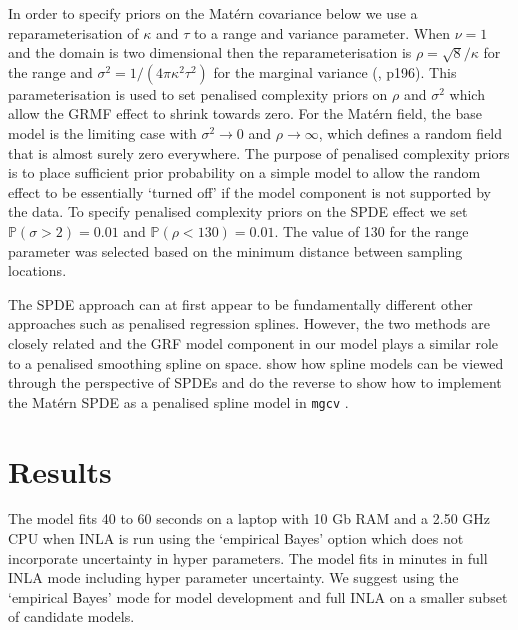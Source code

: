 \documentclass{stylefile16/statsoc}
\begin{document}
In order to specify priors on the Mat\'ern covariance below we use a reparameterisation of $\kappa$ and $\tau$ to a range and variance parameter.  When $\nu = 1$ and the domain is two dimensional then the reparameterisation is $\rho = \sqrt{8} / \kappa$ for the range and $\sigma^2 = 1 / (4\pi\kappa^2\tau^2)$ for the marginal variance (\cite{blangiardo_spatial_2013}, p196).  This parameterisation is used to set penalised complexity priors \citep{simpson_penalising_2017} on $\rho$ and $\sigma^2$ which allow the GRMF effect to shrink towards zero.  For the Mat\'ern field, the base model is the limiting case with $\sigma^2 \rightarrow 0$ and $\rho \rightarrow \infty$, which defines a random field that is almost surely zero everywhere.  The purpose of penalised complexity priors is to place sufficient prior probability on a simple model to allow the random effect to be essentially `turned off' if the model component is not supported by the data.  To specify penalised complexity priors on the SPDE effect we set $\mathbb{P}(\sigma > 2) = 0.01$ and $\mathbb{P}(\rho < 130) = 0.01$.  The value of 130 for the range parameter was selected based on the minimum distance between sampling locations.  

The SPDE approach can at first appear to be fundamentally different  other approaches such as penalised regression splines.  However, the two methods are closely related and the GRF model component in our model plays a similar role to a penalised smoothing spline on space.  \cite{yue_bayesian_2014} show how spline models can be viewed through the perspective of SPDEs and \cite{ miller_understanding_2019} do the reverse to show how to implement the Mat\'ern SPDE as a penalised spline model in \texttt{mgcv} \citep{wood_gam_2017}.

\section{Results}
\label{sec-results} 

The model fits 40 to 60 seconds on a laptop with 10 Gb RAM and a 2.50 GHz CPU when INLA is run using the `empirical Bayes' option which does not incorporate uncertainty in hyper parameters.  The model fits in minutes in full INLA mode including hyper parameter uncertainty.  We suggest using the `empirical Bayes' mode for model development and full INLA on a smaller subset of candidate models.  
\end{document}
